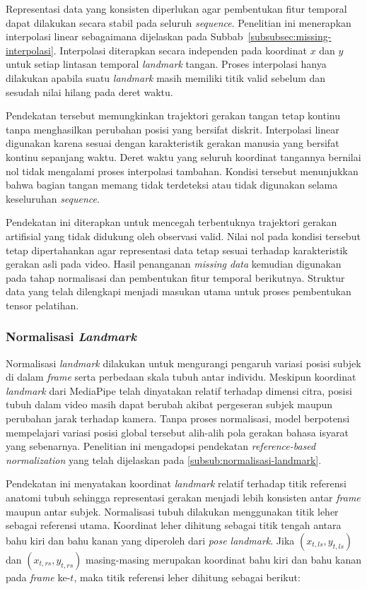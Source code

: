 Representasi data yang konsisten diperlukan agar pembentukan fitur temporal dapat dilakukan secara stabil pada seluruh \textit{sequence}. 
Penelitian ini menerapkan interpolasi linear sebagaimana dijelaskan pada Subbab~\ref{subsubsec:missing-interpolasi}. 
Interpolasi diterapkan secara independen pada koordinat $x$ dan $y$ untuk setiap lintasan temporal \textit{landmark} tangan. 
Proses interpolasi hanya dilakukan apabila suatu \textit{landmark} masih memiliki titik valid sebelum dan sesudah nilai hilang pada deret waktu. 

Pendekatan tersebut memungkinkan trajektori gerakan tangan tetap kontinu tanpa menghasilkan perubahan posisi yang bersifat diskrit. 
Interpolasi linear digunakan karena sesuai dengan karakteristik gerakan manusia yang bersifat kontinu sepanjang waktu. 
Deret waktu yang seluruh koordinat tangannya bernilai nol tidak mengalami proses interpolasi tambahan. 
Kondisi tersebut menunjukkan bahwa bagian tangan memang tidak terdeteksi atau tidak digunakan selama keseluruhan \textit{sequence}. 

Pendekatan ini diterapkan untuk mencegah terbentuknya trajektori gerakan artifisial yang tidak didukung oleh observasi valid. 
Nilai nol pada kondisi tersebut tetap dipertahankan agar representasi data tetap sesuai terhadap karakteristik gerakan asli pada video. 
Hasil penanganan \textit{missing data} kemudian digunakan pada tahap normalisasi dan pembentukan fitur temporal berikutnya. 
Struktur data yang telah dilengkapi menjadi masukan utama untuk proses pembentukan tensor pelatihan.

\subsubsection{Normalisasi \textit{Landmark}}
\label{subsubsec:step-normalisasi-landmark}
Normalisasi \textit{landmark} dilakukan untuk mengurangi pengaruh variasi posisi subjek di dalam \textit{frame} serta perbedaan skala tubuh antar individu.
Meskipun koordinat \textit{landmark} dari MediaPipe telah dinyatakan relatif terhadap dimensi citra, posisi tubuh dalam video masih dapat berubah akibat pergeseran subjek maupun perubahan jarak terhadap kamera.
Tanpa proses normalisasi, model berpotensi mempelajari variasi posisi global tersebut alih-alih pola gerakan bahasa isyarat yang sebenarnya.
Penelitian ini mengadopsi pendekatan \textit{reference-based normalization} yang telah dijelaskan pada \ref{subsub:normalisasi-landmark}.

Pendekatan ini menyatakan koordinat \textit{landmark} relatif terhadap titik referensi anatomi tubuh sehingga representasi gerakan menjadi lebih konsisten antar \textit{frame} maupun antar subjek.
Normalisasi tubuh dilakukan menggunakan titik leher sebagai referensi utama. 
Koordinat leher dihitung sebagai titik tengah antara bahu kiri dan bahu kanan yang diperoleh dari \textit{pose landmark}. 
Jika $(x_{t,ls}, y_{t,ls})$ dan $(x_{t,rs}, y_{t,rs})$ masing-masing merupakan koordinat bahu kiri dan bahu kanan pada \textit{frame} ke-$t$, maka titik referensi leher dihitung sebagai berikut:

